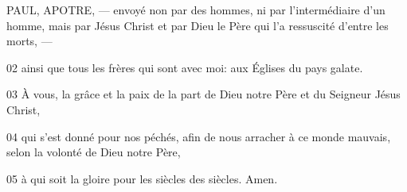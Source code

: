 PAUL, APOTRE, --- envoyé non par des hommes, ni par l’intermédiaire d’un homme, mais par Jésus Christ et par Dieu le Père qui l’a ressuscité d’entre les morts, ---

02 ainsi que tous les frères qui sont avec moi: aux Églises du pays galate.

03 À vous, la grâce et la paix de la part de Dieu notre Père et du Seigneur Jésus Christ,

04 qui s’est donné pour nos péchés, afin de nous arracher à ce monde mauvais, selon la volonté de Dieu notre Père,

05 à qui soit la gloire pour les siècles des siècles. Amen.
